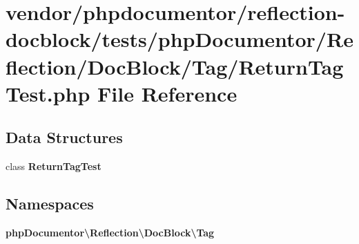 \section{vendor/phpdocumentor/reflection-\/docblock/tests/php\+Documentor/\+Reflection/\+Doc\+Block/\+Tag/\+Return\+Tag\+Test.php File Reference}
\label{_return_tag_test_8php}
\subsection*{Data Structures}
\begin{DoxyCompactItemize}
\item 
class {\bf Return\+Tag\+Test}
\end{DoxyCompactItemize}
\subsection*{Namespaces}
\begin{DoxyCompactItemize}
\item 
 {\bf php\+Documentor\textbackslash{}\+Reflection\textbackslash{}\+Doc\+Block\textbackslash{}\+Tag}
\end{DoxyCompactItemize}
